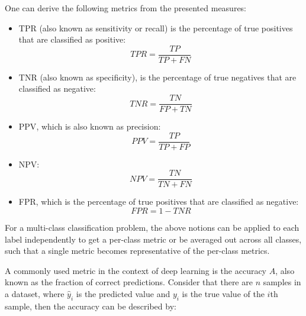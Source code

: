     One can derive the following metrics from the presented measures:
    \begin{itemize}
        \item \ac{TPR} (also known as sensitivity or recall) is the percentage of true positives that are classified as positive:
        \begin{equation}
            TPR = \frac{TP}{TP + FN}
            \label{eq:tpr}
        \end{equation}
        
        \item \ac{TNR} (also known as specificity), is the percentage of true negatives that are classified as negative:
        \begin{equation}
            TNR = \frac{TN}{FP + TN}
            \label{eq:tnr}
        \end{equation}
        
        \item \ac{PPV}, which is also known as precision:
        \begin{equation}
            PPV = \frac{TP}{TP + FP}
            \label{eq:ppv}
        \end{equation}
        
        \item \ac{NPV}:
        \begin{equation}
            NPV = \frac{TN}{TN + FN}
            \label{eq:npv}
        \end{equation}
        
        \item \ac{FPR}, which is the percentage of true positives that are classified as negative:
        \begin{equation}
            FPR = 1 - TNR
            \label{eq:fpr}
        \end{equation}
    \end{itemize}
    
    For a multi-class classification problem, the above notions can be applied to each label independently to get a per-class metric or be averaged out across all classes, such that a single metric becomes representative of the per-class metrics. \par
    
    A commonly used metric in the context of deep learning is the accuracy $A$, also known as the fraction of correct predictions. Consider that there are $n$ samples in a dataset, where $\hat{y}_i$ is the predicted value and $y_i$ is the true value of the $i$th sample, then the accuracy can be described by: 

